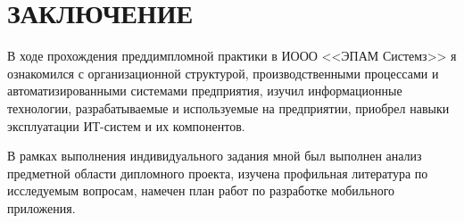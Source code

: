 \section*{ЗАКЛЮЧЕНИЕ}

В ходе прохождения преддимпломной практики в ИООО <<ЭПАМ Системз>> я ознакомился с
организационной структурой, производственными процессами и автоматизированными системами предприятия,
изучил информационные технологии, разрабатываемые и используемые на предприятии,
приобрел навыки эксплуатации ИТ-систем и их компонентов.

В рамках выполнения индивидуального задания мной был выполнен анализ
предметной области дипломного проекта, изучена профильная литература по
исследуемым вопросам, намечен план работ по разработке мобильного приложения.
